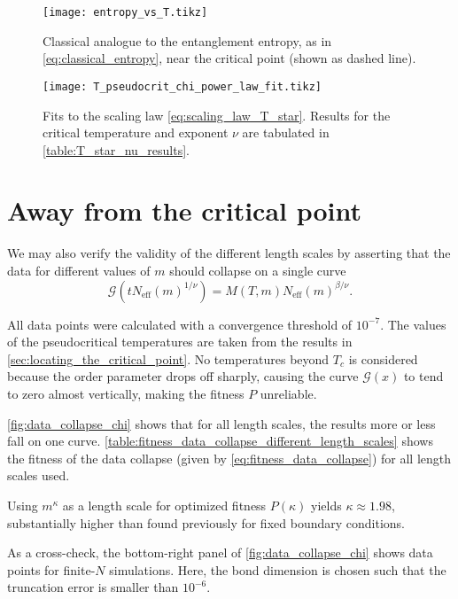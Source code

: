 \begin{figure}
  \texttt{[image: entropy\_vs\_T.tikz]}
  \caption{Classical analogue to the entanglement entropy, as in \autoref{eq:classical_entropy},
  near the critical point (shown as dashed line).}\label{fig:entropy_vs_T}
\end{figure}

\begin{figure}
  \texttt{[image: T\_pseudocrit\_chi\_power\_law\_fit.tikz]}
  \caption{Fits to the scaling law \autoref{eq:scaling_law_T_star}.
  Results for the critical temperature and exponent $\nu$ are tabulated in
  \autoref{table:T_star_nu_results}.}\label{fig:T_pseudocrit_chi_power_law_fit}
\end{figure}

\section{Away from the critical point}

We may also verify the validity of the different length scales by asserting that the data for different values of $m$
should collapse on a single curve
\begin{equation}
  \mathcal{G}(t N_{\text{eff}}(m)^{1/\nu}) = M(T, m) N_{\text{eff}}(m)^{\beta/\nu}.
\end{equation}

All data points were calculated with a convergence threshold of $10^{-7}$.
The values of the pseudocritical temperatures are taken from the results in \autoref{sec:locating_the_critical_point}.
No temperatures beyond $T_c$ is considered because the order parameter drops off sharply,
causing the curve $\mathcal{G}(x)$ to tend to zero almost vertically, making the fitness $P$ unreliable.

\autoref{fig:data_collapse_chi} shows that for all length scales, the results more or less fall on one curve.
\autoref{table:fitness_data_collapse_different_length_scales} shows the fitness of the data collapse
\cite{bhattacharjee2001measure} (given by \autoref{eq:fitness_data_collapse}) for all length scales used.


Using $m^{\kappa}$ as a length scale for optimized fitness $P(\kappa)$ yields $\kappa \approx 1.98$,
substantially higher than found previously for fixed boundary conditions.

As a cross-check, the bottom-right panel of \autoref{fig:data_collapse_chi} shows data points for finite-$N$
simulations. Here, the bond dimension is chosen such that the truncation error is smaller than $10^{-6}$.

